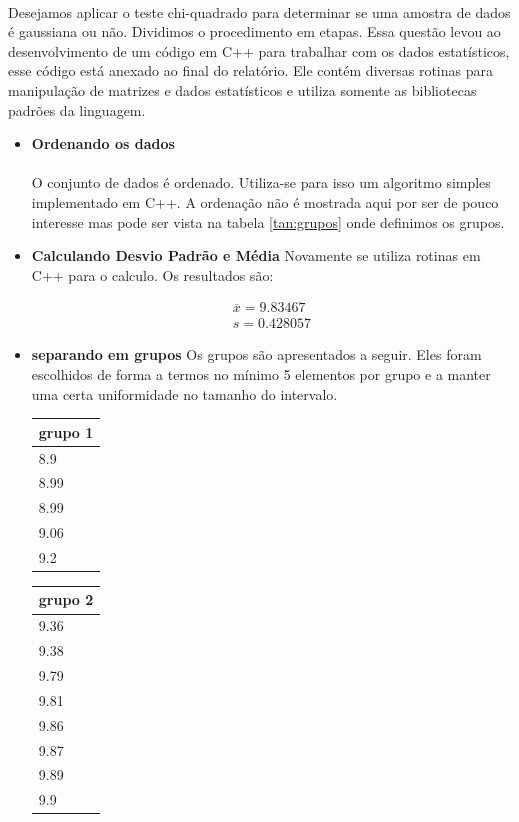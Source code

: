 \documentclass[a4paper,11pt]{article}
\begin{document}
\paragraph{}Desejamos aplicar o teste chi-quadrado para determinar se uma amostra de dados é gaussiana ou não.
Dividimos o procedimento em etapas. Essa questão levou ao desenvolvimento de um código em C++ para trabalhar
com os dados estatísticos, esse código está anexado ao final do relatório. Ele contém diversas rotinas para manipulação
de matrizes e dados estatísticos e utiliza somente as bibliotecas padrões da linguagem.

\begin{itemize}
\item \textbf{Ordenando os dados}
\paragraph{} O conjunto de dados é ordenado. Utiliza-se para isso um algoritmo simples implementado em C++. 
A ordenação não é mostrada aqui por ser de pouco interesse mas pode ser vista na tabela \ref{tan:grupos}
 onde definimos os grupos.

\item \textbf{Calculando Desvio Padrão e Média}
Novamente se utiliza rotinas em C++ para o calculo. Os resultados são:

\begin{equation}
	\begin{array}{l}
		\overline{x} = 9.83467 \\
		s = 0.428057 
	\end{array}
\end{equation}

\item \textbf{separando em grupos}
Os grupos são apresentados a seguir. Eles foram escolhidos de forma a termos no 
mínimo 5 elementos por grupo e a manter uma certa uniformidade no tamanho do intervalo.
\FloatBarrier
\begin{table}[!htp]
	\begin{tabular}{|l|} \hline
\textbf{grupo 1} \\ \hline
8.9 \\ \hline
8.99\\ \hline
8.99\\ \hline
9.06\\ \hline
9.2\\ \hline
	\end{tabular}
	\begin{tabular}{|l|} \hline
\textbf{grupo 2}\\ \hline
9.36\\ \hline
9.38\\ \hline
9.79\\ \hline
9.81\\ \hline
9.86 \\ \hline
9.87\\ \hline
9.89\\ \hline
9.9\\ \hline


\end{tabular}
\end{table}
\end{itemize}
\end{document}
